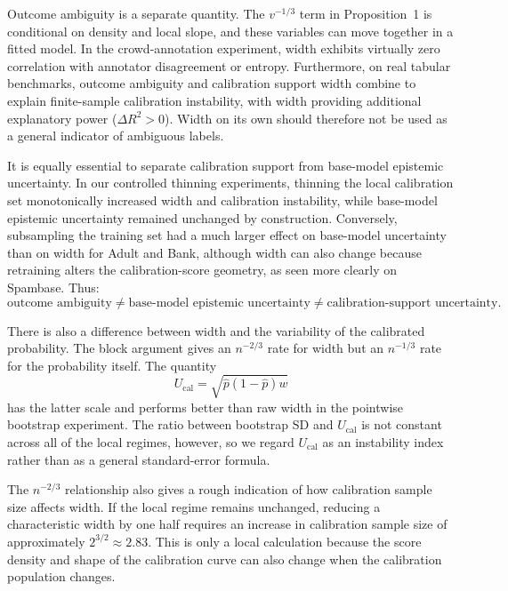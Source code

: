 \documentclass[11pt]{article}
\begin{document}
	Outcome ambiguity is a separate quantity. The $v^{-1/3}$ term in Proposition~1 is conditional on density and local slope, and these variables can move together in a fitted model. In the crowd-annotation experiment, width exhibits virtually zero correlation with annotator disagreement or entropy. Furthermore, on real tabular benchmarks, outcome ambiguity and calibration support width combine to explain finite-sample calibration instability, with width providing additional explanatory power ($\Delta R^2 > 0$). Width on its own should therefore not be used as a general indicator of ambiguous labels.

	It is equally essential to separate calibration support from base-model epistemic uncertainty. In our controlled thinning experiments, thinning the local calibration set monotonically increased width and calibration instability, while base-model epistemic uncertainty remained unchanged by construction. Conversely, subsampling the training set had a much larger effect on base-model uncertainty than on width for Adult and Bank, although width can also change because retraining alters the calibration-score geometry, as seen more clearly on Spambase. Thus:
	\begin{equation*}
		\text{outcome ambiguity} \neq \text{base-model epistemic uncertainty} \neq \text{calibration-support uncertainty}.
	\end{equation*}

	There is also a difference between width and the variability of the calibrated probability. The block argument gives an $n^{-2/3}$ rate for width but an $n^{-1/3}$ rate for the probability itself. The quantity
	\begin{equation}
		U_{\mathrm{cal}}=\sqrt{\hat p(1-\hat p)w}
	\end{equation}
	has the latter scale and performs better than raw width in the pointwise bootstrap experiment. The ratio between bootstrap SD and $U_{\mathrm{cal}}$ is not constant across all of the local regimes, however, so we regard $U_{\mathrm{cal}}$ as an instability index rather than as a general standard-error formula.

	The $n^{-2/3}$ relationship also gives a rough indication of how calibration sample size affects width. If the local regime remains unchanged, reducing a characteristic width by one half requires an increase in calibration sample size of approximately $2^{3/2}\approx2.83$. This is only a local calculation because the score density and shape of the calibration curve can also change when the calibration population changes.
\end{document}
